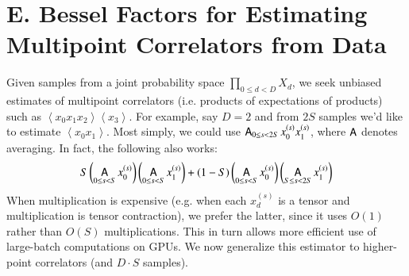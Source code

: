 \documentclass{article}
\newcommand{\wrap}[1]{\left(#1\right)}
\newcommand{\wang}[1]{\left\langle#1\right\rangle}
\DeclareMathOperator*{\Avg}{\text{\sffamily A}}
\begin{document}
\section*{E. Bessel Factors for Estimating Multipoint Correlators from Data}
    Given samples from a joint probability space $\prod_{0\leq d<D} X_d$, we
    seek unbiased estimates of multipoint correlators (i.e. products of
    expectations of products) such as $\wang{x_0 x_1 x_2}\wang{x_3}$.  For
    example, say $D=2$ and from $2S$ samples we'd like to estimate $\wang{x_0
    x_1}$.  Most simply, we could use $\Avg_{0\leq s<2S} x_0^{(s)} x_1^{(s)}$,
    where $\Avg$ denotes averaging.  In fact, the following also works:
    \begin{equation} \label{eq:bessel}
        S
        \wrap{\Avg_{0\leq s< S} x_0^{(s)}}
        \wrap{\Avg_{0\leq s< S} x_1^{(s)}}
        +
        (1-S)
        \wrap{\Avg_{0\leq s< S} x_0^{(s)}}
        \wrap{\Avg_{S\leq s<2S} x_1^{(s)}}
    \end{equation}
    When multiplication is expensive (e.g. when each $x_d^{(s)}$ is a tensor
    and multiplication is tensor contraction), we prefer the latter, since it
    uses $O(1)$ rather than $O(S)$ multiplications.  This in turn allows more
    efficient use of large-batch computations on GPUs.  We now generalize this
    estimator to higher-point correlators (and $D\cdot S$ samples).
\end{document}
